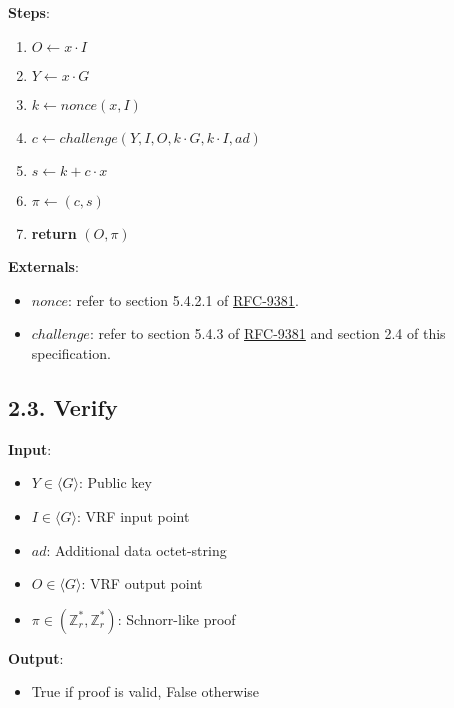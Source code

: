 \documentclass[
]{article}
\providecommand{\tightlist}{%
  \setlength{\itemsep}{0pt}\setlength{\parskip}{0pt}}
\begin{document}
\textbf{Steps}:

\begin{enumerate}
\def\labelenumi{\arabic{enumi}.}
\tightlist
\item
  \(O \leftarrow x \cdot I\)
\item
  \(Y \leftarrow x \cdot G\)
\item
  \(k \leftarrow nonce(x, I)\)
\item
  \(c \leftarrow challenge(Y, I, O, k \cdot G, k \cdot I, ad)\)
\item
  \(s \leftarrow k + c \cdot x\)
\item
  \(\pi \leftarrow (c, s)\)
\item
  \textbf{return} \((O, \pi)\)
\end{enumerate}

\textbf{Externals}:

\begin{itemize}
\tightlist
\item
  \(nonce\): refer to section 5.4.2.1 of
  \href{https://datatracker.ietf.org/doc/rfc9381}{RFC-9381}.
\item
  \(challenge\): refer to section 5.4.3 of
  \href{https://datatracker.ietf.org/doc/rfc9381}{RFC-9381} and section
  2.4 of this specification.
\end{itemize}

\hypertarget{verify}{%
\subsection{2.3. Verify}\label{verify}}

\textbf{Input}:

\begin{itemize}
\tightlist
\item
  \(Y \in \langle G \rangle\): Public key
\item
  \(I \in \langle G \rangle\): VRF input point
\item
  \(ad\): Additional data octet-string
\item
  \(O \in \langle G \rangle\): VRF output point
\item
  \(\pi \in (\mathbb{Z}^*_r, \mathbb{Z}^*_r)\): Schnorr-like proof
\end{itemize}

\textbf{Output}:

\begin{itemize}
\tightlist
\item
  True if proof is valid, False otherwise
\end{itemize}
\end{document}
